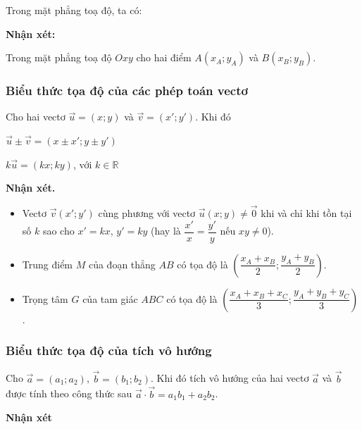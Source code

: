 \begin{boxdn}
	Trong mặt phẳng toạ độ, ta có:
\end{boxdn}
\textbf{Nhận xét:} 
\begin{boxdn}
	Trong mặt phẳng toạ độ $Oxy$ cho hai điểm $A(x_A;y_A)$ và $B(x_B;y_B)$. \begin{center}
	\end{center}
\end{boxdn}
\subsubsection{Biểu thức tọa độ của các phép toán vectơ}
\begin{boxdn}
	Cho hai vectơ $\vec{u}=(x;y)$ và $\vec{v}=(x';y')$. Khi đó
	\begin{listEX}[2]
		\item $\vec{u}\pm \vec{v}=(x\pm x';y\pm y')$
		\item $k\vec{u}=(kx;ky)$, với $k\in\mathbb{R}$
	\end{listEX}
\end{boxdn}
\textbf{Nhận xét.}
\begin{itemize}
	\item Vectơ $\vec{v}(x';y')$ cùng phương với vectơ $\vec{u}(x;y)\neq \vec{0}$ khi và chỉ khi tồn tại số $k$ sao cho $x'=kx$, $y'=ky$ (hay là $\dfrac{x'}{x}=\dfrac{y'}{y}$ nếu $xy\neq 0$).
	\item Trung điểm $M$ của đoạn thẳng $AB$ có tọa độ là $\left(\dfrac{x_A+x_B}{2};\dfrac{y_A+y_B}{2}\right)$.
	\item Trọng tâm $G$ của tam giác $ABC$ có tọa độ là $\left(\dfrac{x_A+x_B+x_C}{3};\dfrac{y_A+y_B+y_C}{3}\right)$.
\end{itemize}
\subsubsection{Biểu thức tọa độ của tích vô hướng}
\begin{boxdn}{}
	Cho $\overrightarrow{a} = (a_1; a_2)$, $\overrightarrow{b} = (b_1; b_2)$. Khi đó tích vô hướng của hai vectơ $\overrightarrow{a}$ và $\overrightarrow{b}$ được tính theo công thức sau $\overrightarrow{a} \cdot \overrightarrow{b} = a_1b_1 + a_2b_2$.
\end{boxdn}
\textbf{Nhận xét}

